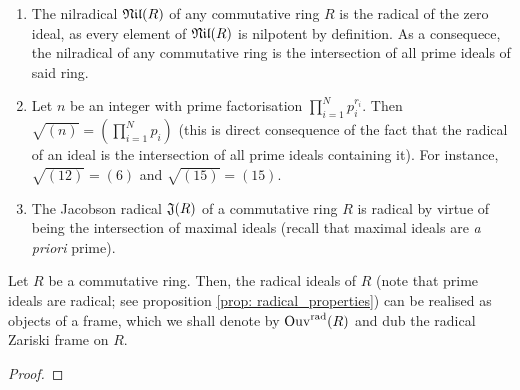                 \begin{example}
                    \noindent
                    \begin{enumerate}
                        \item The nilradical $\mathfrak{Nil}(R)$ of any commutative ring $R$ is the radical of the zero ideal, as every element of $\mathfrak{Nil}(R)$ is nilpotent by definition. As a consequece, the nilradical of any commutative ring is the intersection of all prime ideals of said ring.
                        \item Let $n$ be an integer with prime factorisation $\prod_{i = 1}^N p_i^{r_i}$. Then $\sqrt{(n)} = \left(\prod_{i = 1}^N p_i\right)$ (this is direct consequence of the fact that the radical of an ideal is the intersection of all prime ideals containing it). For instance, $\sqrt{(12)} = (6)$ and $\sqrt{(15)} = (15)$. 
                        \item The Jacobson radical $\mathfrak{J}(R)$ of a commutative ring $R$ is radical by virtue of being the intersection of maximal ideals (recall that maximal ideals are \textit{a priori} prime).
                    \end{enumerate}
                \end{example}
                
                \begin{proposition} \label{prop: radical_frame}
                    Let $R$ be a commutative ring. Then, the radical ideals of $R$ (note that prime ideals are radical; see proposition \ref{prop: radical_properties}) can be realised as objects of a frame, which we shall denote by $\mathrm{Ouv}^{\mathrm{rad}}(R)$ and dub the radical Zariski frame on $R$.
                \end{proposition}
                    \begin{proof}
                        
                    \end{proof}
                
